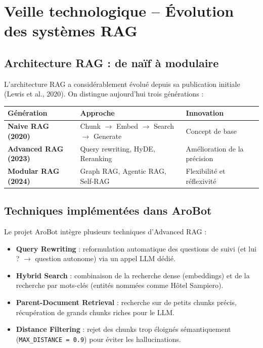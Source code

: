 \documentclass[12pt,a4paper]{report}
\begin{document}
\section{Veille technologique -- \'{E}volution des syst\`{e}mes RAG}

\subsection{Architecture RAG : de na\"{i}f \`{a} modulaire}

L'architecture RAG a consid\'{e}rablement \'{e}volu\'{e} depuis sa publication initiale
(Lewis et al., 2020). On distingue aujourd'hui trois g\'{e}n\'{e}rations :

\begin{center}
\renewcommand{\arraystretch}{1.4}
\begin{tabular}{>{\bfseries}p{3.5cm} p{3.5cm} p{6cm}}
  \toprule
  \rowcolor{rowblue}
  \textbf{G\'{e}n\'{e}ration} & \textbf{Approche} & \textbf{Innovation} \\
  \midrule
  Naive RAG (2020) & Chunk $\rightarrow$ Embed $\rightarrow$ Search $\rightarrow$ Generate & Concept de base \\
  Advanced RAG (2023) & Query rewriting, HyDE, Reranking & Am\'{e}lioration de la pr\'{e}cision \\
  Modular RAG (2024) & Graph RAG, Agentic RAG, Self-RAG & Flexibilit\'{e} et r\'{e}flexivit\'{e} \\
  \bottomrule
\end{tabular}
\end{center}

\subsection{Techniques impl\'{e}ment\'{e}es dans AroBot}

Le projet AroBot int\`{e}gre plusieurs techniques d'Advanced RAG :

\begin{itemize}[leftmargin=*]
  \item \textbf{Query Rewriting} : reformulation automatique des questions de suivi
        (\og{}et lui ?\fg{} $\rightarrow$ question autonome) via un appel LLM d\'{e}di\'{e}.
  \item \textbf{Hybrid Search} : combinaison de la recherche dense (embeddings)
        et de la recherche par mots-cl\'{e}s (entit\'{e}s nomm\'{e}es comme \og{}H\^{o}tel Sampiero\fg{}).
  \item \textbf{Parent-Document Retrieval} : recherche sur de petits chunks pr\'{e}cis,
        r\'{e}cup\'{e}ration de grands chunks riches pour le LLM.
  \item \textbf{Distance Filtering} : rejet des chunks trop \'{e}loign\'{e}s s\'{e}mantiquement
        (\texttt{MAX\_DISTANCE = 0.9}) pour \'{e}viter les hallucinations.
\end{itemize}
\end{document}
